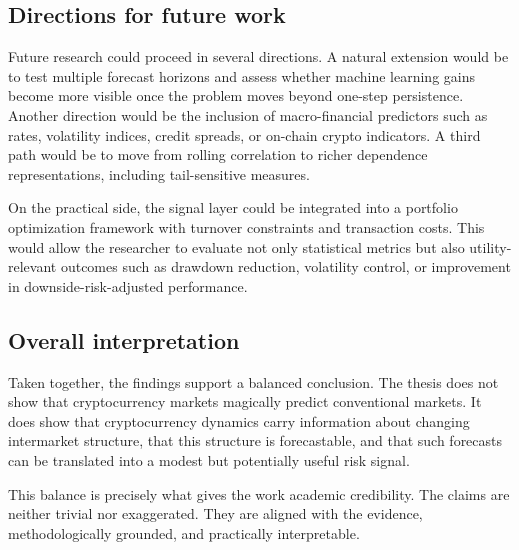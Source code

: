 \subsection{Directions for future work}

Future research could proceed in several directions. A natural extension would be to test multiple forecast horizons and assess whether machine learning gains become more visible once the problem moves beyond one-step persistence. Another direction would be the inclusion of macro-financial predictors such as rates, volatility indices, credit spreads, or on-chain crypto indicators. A third path would be to move from rolling correlation to richer dependence representations, including tail-sensitive measures.

On the practical side, the signal layer could be integrated into a portfolio optimization framework with turnover constraints and transaction costs. This would allow the researcher to evaluate not only statistical metrics but also utility-relevant outcomes such as drawdown reduction, volatility control, or improvement in downside-risk-adjusted performance.

\subsection{Overall interpretation}

Taken together, the findings support a balanced conclusion. The thesis does not show that cryptocurrency markets magically predict conventional markets. It does show that cryptocurrency dynamics carry information about changing intermarket structure, that this structure is forecastable, and that such forecasts can be translated into a modest but potentially useful risk signal.

This balance is precisely what gives the work academic credibility. The claims are neither trivial nor exaggerated. They are aligned with the evidence, methodologically grounded, and practically interpretable.
